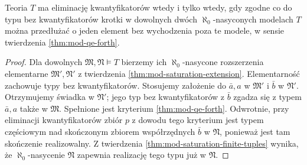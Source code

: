 \begin{wniosek}
\label{cor:mod-qe-saturated}
Teoria $T$ ma eliminację kwantyfikatorów wtedy i tylko
wtedy, gdy zgodne co do typu bez kwantyfikatorów krotki
w dowolnych dwóch $\aleph_0$-nasyconych modelach $T$
można przedłużać o jeden element bez wychodzenia
poza te modele, w sensie twierdzenia \ref{thm:mod-qe-forth}.
\end{wniosek}
\begin{proof}
Dla dowolnych $\mathfrak M,\mathfrak N\models T$ bierzemy
ich $\aleph_0$-nasycone rozszerzenia elementarne
$\mathfrak M',\mathfrak N'$ z twierdzenia
\ref{thm:mod-saturation-extension}. Elementarność
zachowuje typy bez kwantyfikatorów. Stosujemy założenie
do $\bar a,a$ w $\mathfrak M'$ i $\bar b$ w $\mathfrak N'$.
Otrzymujemy świadka w $\mathfrak N'$; jego typ bez
kwantyfikatorów z $\bar b$ zgadza się z typem
$\bar a,a$ także w $\mathfrak M$. Spełnione jest
kryterium \ref{thm:mod-qe-forth}.
Odwrotnie, przy eliminacji kwantyfikatorów zbiór $p$
z dowodu tego kryterium jest typem częściowym nad
skończonym zbiorem współrzędnych $\bar b$ w $\mathfrak N$,
ponieważ jest tam skończenie realizowalny. Z twierdzenia
\ref{thm:mod-saturation-finite-tuples} wynika, że
$\aleph_0$-nasycenie $\mathfrak N$ zapewnia realizację
tego typu już w $\mathfrak N$.
\end{proof}

